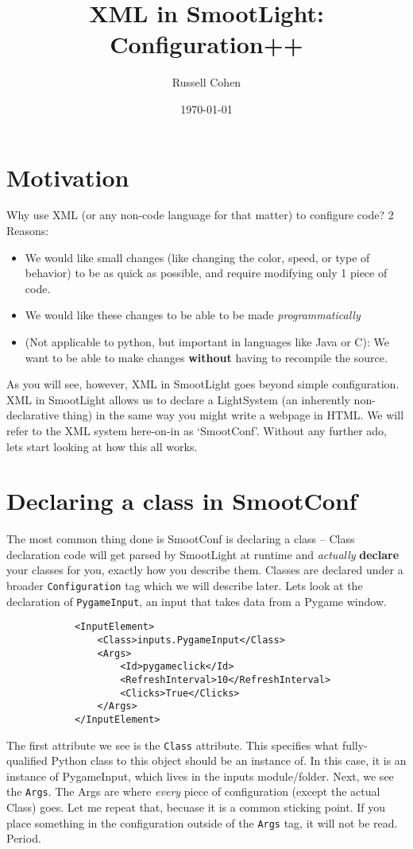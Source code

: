 \documentclass{article}
\begin{document}
    \title{XML in SmootLight: Configuration++}
    \author{Russell Cohen}
    \date{\today}
    \maketitle
    \section{Motivation}
        Why use XML (or any non-code language for that matter) to configure code?  2 Reasons: 
        \begin{itemize}
            \item We would like small changes (like changing the color, speed, or type of behavior)
            to be as quick as possible, and require modifying only 1 piece of code.
            \item We would like these changes to be able to be made \emph{programmatically}
            \item (Not applicable to python, but important in languages like Java or C): We want to
            be able to make changes \textbf{without} having to recompile the source.
        \end{itemize}
        As you will see, however, XML in SmootLight goes beyond simple configuration.  XML in
        SmootLight allows us to declare a LightSystem (an inherently non-declarative thing) in the
        same way you might write a webpage in HTML.  We will refer to the XML system here-on-in as
        `SmootConf'.  Without any further ado, lets start looking at
        how this all works.
    \section{Declaring a class in SmootConf}
        The most common thing done is SmootConf is declaring a class -- Class declaration code will
        get parsed by SmootLight at runtime and \emph{actually} \textbf{declare} your classes for
        you, exactly how you describe them.  Classes are declared under a broader
        \texttt{Configuration} tag which we will describe later.  Lets look at the declaration of
        \texttt{PygameInput}, an input that takes data from a Pygame window.
        \begin{verbatim}
            <InputElement>
                <Class>inputs.PygameInput</Class>
                <Args>
                    <Id>pygameclick</Id>
                    <RefreshInterval>10</RefreshInterval>
                    <Clicks>True</Clicks>
                </Args>
            </InputElement>
        \end{verbatim}
        The first attribute we see is the \texttt{Class} attribute.  This specifies what
        fully-qualified Python class to this object should be an instance of.  In this case, it is
        an instance of PygameInput, which lives in the inputs module/folder.  Next, we see the
        \texttt{Args}.  The Args are where \emph{every} piece of configuration (except the actual
        Class) goes.  Let me repeat that, becuase it is a common sticking point.  If you place
        something in the configuration outside of the \texttt{Args} tag, it will not be read.
        Period.
\end{document}
